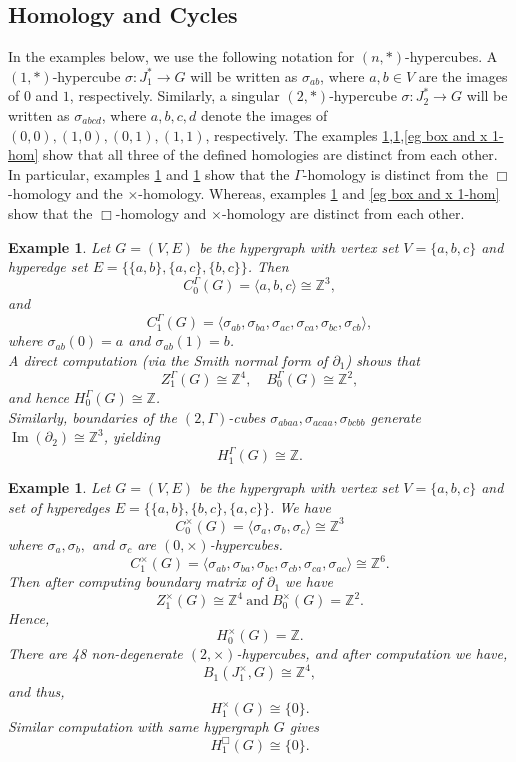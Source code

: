 \documentclass[10pt,a4paper]{amsart}
\newtheorem{ex}[subsection]{Example}
\begin{document}
\subsection{Homology and Cycles}

In the examples below, we use the following notation for $(n,*)$-hypercubes.
A $(1,*)$-hypercube $\sigma \colon J_1^* \to G$ will be written as
$\sigma_{ab}$, where $a,b\in V$ are the images of $0$ and $1$,
respectively.
Similarly, a singular $(2,*)$-hypercube $\sigma \colon J_2^* \to G$ will be written
as $\sigma_{abcd}$, where $a,b,c,d$ denote the images of
$(0,0),(1,0),(0,1),(1,1)$, respectively. The examples \ref{eg gamma 3-cycle},\ref{eg x and box hom},\ref{eg box and x 1-hom} show that all three of the defined homologies are distinct from each other. In particular, examples \ref{eg gamma 3-cycle} and \ref{eg x and box hom} show that the $\Gamma$-homology is distinct from the $\Box$-homology and the $\times$-homology. Whereas, examples \ref{eg x and box hom} and \ref{eg box and x 1-hom} show that the $\Box$-homology and $\times$-homology are distinct from each other.



\begin{ex}\label{eg gamma 3-cycle}
Let $G=(V,E)$ be the hypergraph with vertex set $V=\{a,b,c\}$ and hyperedge set $E=\{\{a,b\},\{a,c\},\{b,c\}\}$. Then
\[
C_0^\Gamma(G)=\langle a,b,c \rangle \cong \mathbb{Z}^3,
\]
and
\[
C_1^\Gamma(G)=\langle \sigma_{ab}, \sigma_{ba}, \sigma_{ac}, \sigma_{ca}, \sigma_{bc}, \sigma_{cb} \rangle,
\]
where $\sigma_{ab}(0)=a$ and $\sigma_{ab}(1)=b$.
\\
A direct computation (via the Smith normal form of $\partial_1$) shows that
\[
Z_1^\Gamma(G)\cong \mathbb{Z}^4, \quad B_0^\Gamma(G)\cong \mathbb{Z}^2,
\]
and hence $H_0^\Gamma(G)\cong \mathbb{Z}$.
\\
Similarly, boundaries of the $(2,\Gamma)$-cubes $\sigma_{abaa}, \sigma_{acaa}, \sigma_{bcbb}$ generate $\operatorname{Im}(\partial_2)\cong \mathbb{Z}^3$, yielding
\[
H_1^\Gamma(G)\cong \mathbb{Z}.
\]
\end{ex}



\begin{ex}\label{eg x and box hom} 
	Let $G=(V,E)$ be the hypergraph with vertex set $V=\{a,b,c\}$ and set of hyperedges $E=\{\{a,b\},\{b,c\},\{a,c\}\}$. We have \[{C}_0^\times(G)=\langle \sigma_a,\sigma_b,\sigma_c\rangle \cong \mathbb{Z}^3\] where $\sigma_a,\sigma_b,$ and $\sigma_c$ are  $(0,\times)$-hypercubes. 	
    \[{C}_1^\times(G)=\langle \sigma_{ab},\sigma_{ba},\sigma_{bc},\sigma_{cb},\sigma_{ca},\sigma_{ac}\rangle \cong \mathbb{Z}^6.\] Then after computing boundary matrix of $\partial_1$ we have  \[{Z}_1^\times(G)\cong\mathbb{Z}^4 ~\text{and} ~ {B}_0^\times(G)=\mathbb{Z}^2.\] Hence, \[H_0^\times(G)=\mathbb{Z}.\] There are 48 non-degenerate $(2,\times)$-hypercubes, and after computation we have, \[{B}_1(J_1^\times,G)\cong \mathbb{Z}^4, \] and thus, \[H_1^\times(G)\cong \{0\}.\] Similar computation with same hypergraph $G$ gives \[H_1^\Box(G)\cong \{0\}.\] 
\end{ex}
\end{document}
